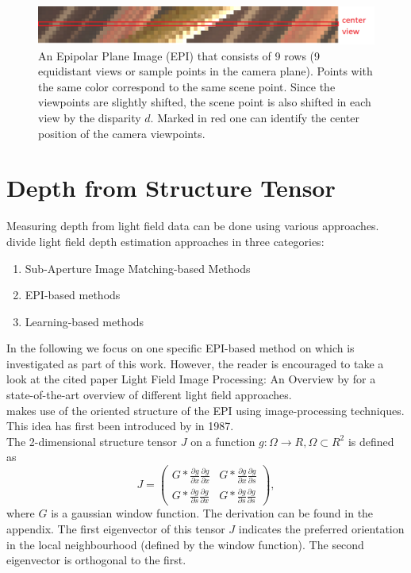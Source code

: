 \documentclass  [
  paper    = a4,
  BCOR     = 10mm,
  twoside,
  fontsize = 12pt,
  fleqn,
  toc      = bibnumbered,
  toc      = listofnumbered,
  numbers  = noendperiod,
  headings = normal,
  listof   = leveldown,
  version  = 3.03
]                                       {scrreprt}
\begin{document}
\begin{figure}
	\centering
	\includegraphics[width=1\linewidth]{images/simple_epi}
	\caption[Example Epipolar Plane image]{An Epipolar Plane Image (EPI) that consists of 9 rows (9 equidistant views or sample points in the camera plane). Points with the same color correspond to the same scene point. Since the viewpoints are slightly shifted, the scene point is also shifted in each view by the disparity $d$. Marked in red one can identify the center position of the camera viewpoints.}
	\label{fig:simpleepi}
\end{figure}

\section{Depth from Structure Tensor}
Measuring depth from light field data can be done using various approaches.
\cite{wu2017light} divide light field depth estimation approaches in three categories:
\begin{enumerate}
	\item Sub-Aperture Image Matching-based Methods
	\item EPI-based methods
	\item Learning-based methods
\end{enumerate}
In the following we focus on one specific EPI-based method on which is investigated as part of this work. However, the reader is encouraged to take a look at the cited paper \glqq Light Field Image Processing: An Overview \grqq by \cite{wu2017light} for a state-of-the-art overview of different light field approaches.\\
\cite{wanner2014orientation} makes use of the oriented structure of the EPI using image-processing techniques. This idea has first been introduced by \cite{bigun1987optimal} in 1987.\\

The 2-dimensional structure tensor $J$  on a function $g:\Omega \rightarrow \!R, \Omega \subset \!R^2 $ is defined as
\begin{equation}\label{eq:structuretensor}
J =\left(
\begin{matrix}
G*\frac{\partial g}{\partial x}\frac{\partial g}{\partial x} & G*\frac{\partial g}{\partial x}\frac{\partial g}{\partial s} \\
G*\frac{\partial g}{\partial s}\frac{\partial g}{\partial x} & G*\frac{\partial g}{\partial s}\frac{\partial g}{\partial s} 
\end{matrix}\right),
\end{equation}
 where $G$ is a gaussian window function. The derivation can be found in the appendix.
 The first eigenvector of this tensor $J$ indicates the preferred orientation in the local neighbourhood (defined by the window function). The second eigenvector is orthogonal to the first. 
 
\end{document}
